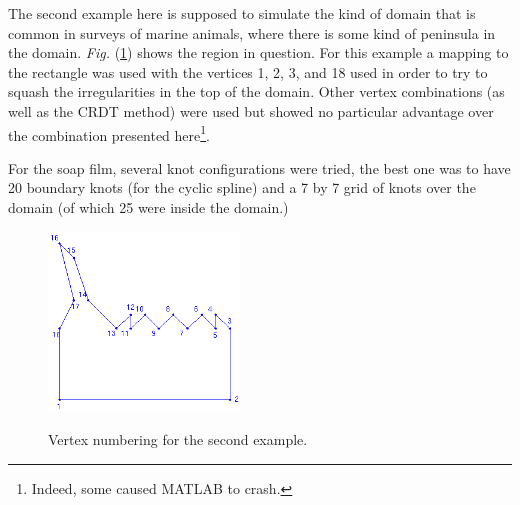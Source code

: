 \documentclass[a4paper,10pt]{amsart}
\newcommand{\Fig}[1]{\emph{Fig.} (\ref{#1})}
\begin{document}
The second example here is supposed to simulate the kind of domain that is common in surveys of marine animals, where there is some kind of peninsula in the domain. \Fig{wigglytop-numbered} shows the region in question. For this example a mapping to the rectangle was used with the vertices 1, 2, 3, and 18 used in order to try to squash the irregularities in the top of the domain. Other vertex combinations (as well as the CRDT method) were used but showed no particular advantage over the combination presented here\footnote{Indeed, some caused MATLAB to crash.}.




For the soap film, several knot configurations were tried, the best one was to have 20 boundary knots (for the cyclic spline) and a 7 by 7 grid of knots over the domain (of which 25 were inside the domain.) 






\begin{figure}
\centering
\includegraphics[width=2in]{figs-otherdomains/wigglytop-numbered.png} \\
\caption{Vertex numbering for the second example.}
\label{wigglytop-numbered}
\end{figure}
\end{document}
